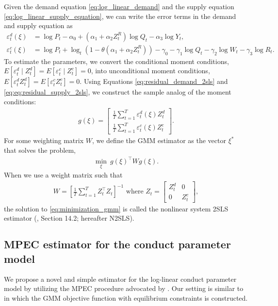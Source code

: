 \documentclass[11pt, a4paper]{article}
\begin{document}
Given the demand equation \eqref{eq:log_linear_demand} and the supply equation \eqref{eq:log_linear_supply_equation}, we can write the error terms in the demand and supply equation as
\begin{align}
    {\varepsilon}_t^d(\xi) & =  \log P_{t} - \alpha_0 + (\alpha_1 + \alpha_2 Z^{R}_{t}) \log Q_t - \alpha_3 \log Y_t \label{eq:residual_demand_2sls}, \\
    {\varepsilon}_t^c(\xi) & =  \log P_t + \log_{t}(1 - \theta(\alpha_1 + \alpha_2 Z^{R}_{t})) -\gamma_0 - \gamma_1 \log Q_t -  \gamma_2 \log W_{t} -\gamma_3 \log R_t \label{eq:eq:residual_supply_2sls}.
\end{align}
To estimate the parameters, we convert the conditional moment conditions, $E[\varepsilon_t^d\mid Z_t^d] = E[\varepsilon_t^c\mid Z_t^c]=0$, into unconditional moment conditions, $E[\varepsilon_t^d Z_t^d] = E[\varepsilon_t^cZ_t^c]=0$.
Using Equations \eqref{eq:residual_demand_2sls} and \eqref{eq:eq:residual_supply_2sls}, we construct the sample analog of the moment conditions:
\begin{align*}
    g(\xi) = \left[\begin{array}{l}
    \frac{1}{T}\sum_{t=1}^T{\varepsilon}^{d}_{t}(\xi)Z_{t}^{d} \\
    \frac{1}{T}\sum_{t=1}^T{\varepsilon}^{c}_{t}(\xi)Z_{t}^{c}
    \end{array}\right].
\end{align*}
For some weighting matrix $W$, we define the GMM estimator as the vector $\xi^*$ that solves the problem,
\begin{align}
    \min_{\xi}\ g(\xi)^\top W g(\xi) \label{eq:minimization_gmm}. 
\end{align}
When we use a weight matrix such that
\begin{align}
    W = \left[\frac{1}{T}\sum_{t = 1}^T Z_t^\top Z_t\right]^{-1} \text{ where } Z_{t}=\left[\begin{array}{ll}
        Z_{t}^{d} & 0 \\
        0 & Z_{t}^{c}
    \end{array}\right],\label{eq:weight_matrix}
\end{align}
the solution to \eqref{eq:minimization_gmm} is called the nonlinear system 2SLS estimator (\cite{wooldridge2010econometric}, Section 14.2; hereafter N2SLS).


\subsection{MPEC estimator for the conduct parameter model}
We propose a novel and simple estimator for the log-linear conduct parameter model by utilizing the MPEC procedure advocated by \cite{su2012constrained}. Our setting is similar to \cite{dube2012improving} in which the GMM objective function with equilibrium constraints is constructed.
\end{document}
